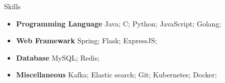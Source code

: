 \documentclass[]{minhuacv}
\begin{document}
	\begin{cvsection}{Skills}
		\begin{cvsubsection}{}{}{}	
			\begin{itemize}
				\item \textbf{Programming Language} Java; C; Python; JavaScript; Golang;
				\item \textbf{Web Framewark} Spring; Flask; ExpressJS;
				\item \textbf{Database} MySQL; Redis; 
				\item \textbf{Miscellaneous} Kafka; Elastic search; Git; Kubernetes; Docker;
			\end{itemize}
		\end{cvsubsection}
	\end{cvsection}
	
\end{document}
